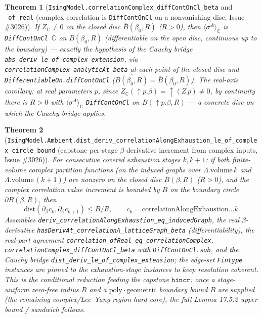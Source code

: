 \documentclass[a4paper,11pt]{article}
\newtheorem{theorem}{Theorem}
\begin{document}
\begin{theorem}[\texttt{IsingModel.correlationComplex\_diffContOnCl\_beta} and
\texttt{\_of\_real} (complex correlation is \texttt{DiffContOnCl} on a nonvanishing disc,
Issue \#3026)]
If $Z_{\mathbb{C}}\ne0$ on the closed disc $\overline{B}(\beta_0,R)$ ($R>0$), then
$\langle\sigma^A\rangle_{\mathbb{C}}$ is \texttt{DiffContOnCl}~$\mathbb{C}$ on
$B(\beta_0,R)$ (differentiable on the open disc, continuous up to the boundary) — exactly
the hypothesis of the Cauchy bridge \texttt{abs\_deriv\_le\_of\_complex\_extension}, via
\texttt{correlationComplex\_analyticAt\_beta} at each point of the closed disc and
\texttt{DifferentiableOn.diffContOnCl} ($\overline{B(\beta_0,R)}=\overline{B}(\beta_0,R)$).
The real-axis corollary: at real parameters $p$, since
$Z_{\mathbb{C}}(\uparrow\!p.\beta)=\uparrow\!(Z\,p)\ne0$, by continuity there is $R>0$ with
$\langle\sigma^A\rangle_{\mathbb{C}}$ \texttt{DiffContOnCl} on $B(\uparrow\!p.\beta,R)$ — a
concrete disc on which the Cauchy bridge applies.
\end{theorem}

\begin{theorem}[\texttt{IsingModel.Ambient.dist\_deriv\_correlationAlongExhaustion\_le\_of\_complex\_circle\_bound}
(capstone per-stage $\beta$-derivative increment from complex inputs, Issue \#3026)]
For consecutive covered exhaustion stages $k,k+1$: if both finite-volume complex partition
functions (on the induced graphs over $\Lambda.\mathrm{volume}\,k$ and
$\Lambda.\mathrm{volume}\,(k{+}1)$) are nonzero on the closed disc $\overline{B}(\beta,R)$
($R>0$), and the complex correlation value increment is bounded by $B$ on the boundary
circle $\partial B(\beta,R)$, then
\[
  \mathrm{dist}(\partial_\beta c_k,\partial_\beta c_{k+1}) \le B/R,
  \qquad c_k=\mathrm{correlationAlongExhaustion}\dots k.
\]
Assembles \texttt{deriv\_correlationAlongExhaustion\_eq\_inducedGraph}, the real
$\beta$-derivative \texttt{hasDerivAt\_correlationΛ\_latticeGraph\_beta} (differentiability),
the real-part agreement \texttt{correlation\_ofReal\_eq\_correlationComplex},
\texttt{correlationComplex\_diffContOnCl\_beta} with \texttt{DiffContOnCl.sub}, and the
Cauchy bridge \texttt{dist\_deriv\_le\_of\_complex\_extension}; the edge-set \texttt{Fintype}
instances are pinned to the exhaustion-stage instances to keep resolution coherent. This is
the conditional reduction feeding the capstone $\mathtt{hincr}$: once a stage-uniform
zero-free radius $R$ and a $\mathrm{poly}\cdot\mathrm{geometric}$ boundary bound $B$ are
supplied (the remaining complex/Lee--Yang-region hard core), the full Lemma 17.5.2 upper
bound / sandwich follows.
\end{theorem}
\end{document}
